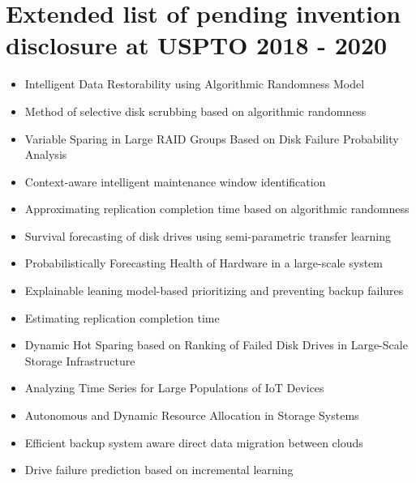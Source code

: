 \documentclass{article}
\begin{document}
\section{Extended list of pending invention disclosure at USPTO 2018 - 2020}
\begin{itemize} \itemsep 1pt

\item{Intelligent Data Restorability using Algorithmic Randomness Model}

\item{Method of selective disk scrubbing based on algorithmic randomness}

\item{Variable Sparing in Large RAID Groups Based on Disk Failure Probability Analysis}

\item{Context-aware intelligent maintenance window identification}

\item{Approximating replication completion time based on algorithmic randomness}

\item{Survival forecasting of disk drives using semi-parametric transfer learning}

\item{Probabilistically Forecasting Health of Hardware in a large-scale system}

\item{Explainable leaning model-based prioritizing and preventing backup failures}

\item{Estimating replication completion time}

\item{Dynamic Hot Sparing based on Ranking of Failed Disk Drives in Large-Scale Storage Infrastructure}

\item{Analyzing Time Series for Large Populations of IoT Devices}

\item{Autonomous and Dynamic Resource Allocation in Storage Systems}

\item{Efficient backup system aware direct data migration between clouds}

\item{Drive failure prediction based on incremental learning}


\end{itemize}
\end{document}
